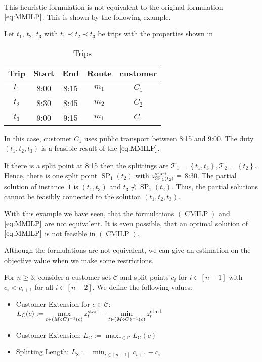 This heuristic formulation is not equivalent to the original formulation $\eqref{eq:MMILP}$. This is shown by the following example.

\begin{example}

Let $t_1$, $t_2$, $t_3$ with $t_1\prec t_2\prec t_3$ be trips with the properties shown in 

\begin{table}[htb]
	\centering
	\begin{tabular}{c|cccc}
		Trip & Start & End & Route & customer \\
		\hline
		$t_1$ & 8:00 & 8:15 & $m_1$ & $C_1$ \\
		$t_2$ & 8:30 & 8:45 & $m_2$ & $C_2$ \\
		$t_3$ & 9:00 & 9:15 & $m_1$ & $C_1$ \\
	\end{tabular}
	\caption{Trips}
	\label{tab:customer_heuristic_example}
\end{table}

In this case, customer $C_1$ uses public transport between 8:15 and 9:00. The duty $\left(t_1,t_2,t_3\right)$ is a feasible result of the $\eqref{eq:MMILP}$.

If there is a split point at 8:15 then the splittings are $\mathcal{T}_1=\left\{t_1,t_3\right\},\mathcal{T}_2=\left\{t_2\right\}$. Hence, there is one split point $\operatorname{SP}_1\left(t_2\right)$ with $z^{\operatorname{start}}_{\operatorname{SP}_1\left(t_2\right)} =$ 8:30. The partial solution of instance~$1$ is $\left(t_1,t_3\right)$ and $t_3\not\prec \operatorname{SP}_1\left(t_2\right)$. Thus, the partial solutions cannot be feasibly connected to the solution $\left(t_1,t_2,t_3\right)$.

\end{example}

With this example we have seen, that the formulations $(\operatorname{CMILP})$ and $\eqref{eq:MMILP}$ are not equivalent. It is even possible, that an optimal solution of $\eqref{eq:MMILP}$ is not feasible in $(\operatorname{CMILP})$.

Although the formulations are not equivalent, we can give an estimation on the objective value when we make some restrictions.

\begin{definition}

For $n\geq 3$, consider a customer set $\mathcal{C}$ and split points $c_i$ for $i\in[n-1]$ with $c_i<c_{i+1}$ for all $i\in[n-2]$. We define the following values:
\begin{itemize}
	\item{Customer Extension for $c\in\mathcal{C}$: $\displaystyle{L_{\operatorname{C}}(c) := \max_{t\in(M\circ C)^{-1}(c)}z^{\operatorname{start}}_t - \min_{t\in(M\circ C)^{-1}(c)}z^{\operatorname{start}}_t}$}
	\item{Customer Extension: $\displaystyle{L_{\operatorname{C}} := \max_{c\in\mathcal{C}} L_{\operatorname{C}}(c)}$}
	\item{Splitting Length: $\displaystyle{L_{\operatorname{S}} := \min_{i\in[n-1]} c_{i+1}-c_i}$}
\end{itemize}

\end{definition}

